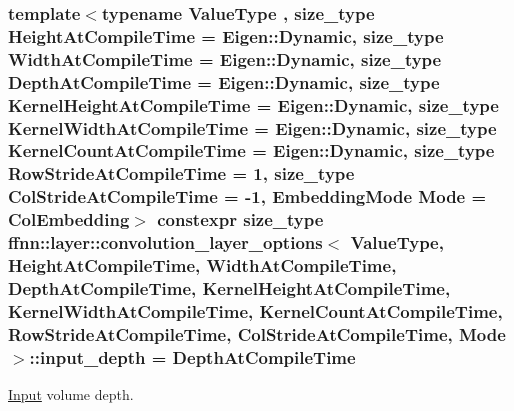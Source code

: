 \hypertarget{structffnn_1_1layer_1_1convolution__layer__options_ae4d23d286d13ecb3a1127bcf34569137}{
\subsubsection[{input\-\_\-depth}]{\setlength{\rightskip}{0pt plus 5cm}template$<$typename Value\-Type , size\-\_\-type Height\-At\-Compile\-Time = Eigen\-::\-Dynamic, size\-\_\-type Width\-At\-Compile\-Time = Eigen\-::\-Dynamic, size\-\_\-type Depth\-At\-Compile\-Time = Eigen\-::\-Dynamic, size\-\_\-type Kernel\-Height\-At\-Compile\-Time = Eigen\-::\-Dynamic, size\-\_\-type Kernel\-Width\-At\-Compile\-Time = Eigen\-::\-Dynamic, size\-\_\-type Kernel\-Count\-At\-Compile\-Time = Eigen\-::\-Dynamic, size\-\_\-type Row\-Stride\-At\-Compile\-Time = 1, size\-\_\-type Col\-Stride\-At\-Compile\-Time = -\/1, Embedding\-Mode Mode = Col\-Embedding$>$ constexpr {\bf size\-\_\-type} {\bf ffnn\-::layer\-::convolution\-\_\-layer\-\_\-options}$<$ Value\-Type, Height\-At\-Compile\-Time, Width\-At\-Compile\-Time, Depth\-At\-Compile\-Time, Kernel\-Height\-At\-Compile\-Time, Kernel\-Width\-At\-Compile\-Time, Kernel\-Count\-At\-Compile\-Time, Row\-Stride\-At\-Compile\-Time, Col\-Stride\-At\-Compile\-Time, Mode $>$\-::input\-\_\-depth = Depth\-At\-Compile\-Time\hspace{0.3cm}{\ttfamily [static]}}}\label{structffnn_1_1layer_1_1convolution__layer__options_ae4d23d286d13ecb3a1127bcf34569137}


\hyperlink{classffnn_1_1layer_1_1_input}{Input} volume depth. 

